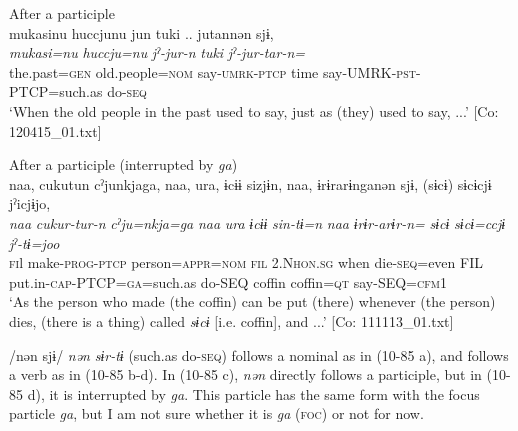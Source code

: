  \ex After a participle\\
      \glll    mukasinu  huccjunu  jun  tuki ..   jutannən  sjɨ,\\
    \textit{mukasi=nu}  \textit{huccju=nu}  \textit{jˀ-jur-n}  \textit{tuki} \textit{jˀ-jur-tar-n=}  \textit{}\\
    the.past=\textsc{gen}  old.people=\textsc{nom}  say-\textsc{umrk}-\textsc{ptcp}  time  say-UMRK-\textsc{pst}-PTCP=such.as  do-\textsc{seq}\\
\glt     ‘When the old people in the past used to say, just as (they) used to say, ...’  [Co: 120415\_01.txt]

  \ex After a participle (interrupted by \textit{ga})\\
      \glll    naa,  cukutun  cˀjunkjaga,  naa,  ura,  ɨcɨɨ  sizjɨn,  naa,  ɨrɨrarɨnganən  sjɨ,  (sɨcɨ)  sɨcɨcjɨ  jˀicjɨjo,\\                                                                                                                                                                                                      
    \textit{naa}  \textit{cukur-tur-n}  \textit{cˀju=nkja=ga}  \textit{naa}  \textit{ura}  \textit{ɨcɨɨ} \textit{sin-tɨ=n}  \textit{naa}  \textit{ɨrɨr-arɨr-n=}  \textit{}  \textit{sɨcɨ} \textit{sɨcɨ=ccjɨ}  \textit{jˀ-tɨ=joo}\\                                                                                                                                                                                                      
    \textsc{fi}l  make-\textsc{prog}-\textsc{ptcp}  person=\textsc{appr}=\textsc{nom}  \textsc{fil}  2.N\textsc{hon}.\textsc{sg}  when   die-\textsc{seq}=even  FIL  put.in-\textsc{cap}-PTCP=\textsc{ga}=such.as  do-SEQ  coffin  coffin=\textsc{qt}  say-SEQ=\textsc{cfm}1\\
    \glt ‘As the person who made (the coffin) can be put (there) whenever (the person) dies, (there is a thing) called \textit{sɨcɨ} [i.e. coffin], and ...’ [Co: 111113\_01.txt]
    \z
\z

/nən sjɨ/ \textit{nən} \textit{sɨr-tɨ} (such.as do-\textsc{seq}) follows a nominal as in (10-85 a), and follows a verb as in (10-85 b-d). In (10-85 c), \textit{nən} directly follows a participle, but in (10-85 d), it is interrupted by \textit{ga}. This particle has the same form with the focus particle \textit{ga}, but I am not sure whether it is \textit{ga} (\textsc{foc}) or not for now.

